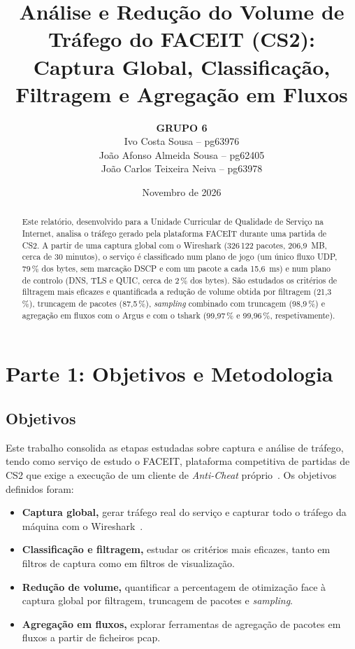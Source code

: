 \documentclass[10.5pt,a4paper]{article}
\title{\textbf{Análise e Redução do Volume de Tráfego do FACEIT (CS2):\\
Captura Global, Classificação, Filtragem e Agregação em Fluxos}}
\author{\textbf{GRUPO 6}\\[2pt]
Ivo Costa Sousa -- pg63976\\
João Afonso Almeida Sousa -- pg62405\\
João Carlos Teixeira Neiva -- pg63978}
\date{Novembro de 2026}
\begin{document}
\maketitle

\begin{abstract}
\noindent Este relatório, desenvolvido para a Unidade Curricular de Qualidade de Serviço na
Internet, analisa o tráfego gerado pela plataforma FACEIT durante uma partida de CS2. A partir
de uma captura global com o Wireshark (326\,122 pacotes, 206,9~MB, cerca de 30 minutos), o
serviço é classificado num plano de jogo (um único fluxo UDP, 79\,\% dos bytes, sem marcação
DSCP e com um pacote a cada 15,6~ms) e num plano de controlo (DNS, TLS e QUIC, cerca de 2\,\%
dos bytes). São estudados os critérios de filtragem mais eficazes e quantificada a redução de
volume obtida por filtragem (21,3\,\%), truncagem de pacotes (87,5\,\%), \emph{sampling}
combinado com truncagem (98,9\,\%) e agregação em fluxos com o Argus e com o tshark
(99,97\,\% e 99,96\,\%, respetivamente).
\end{abstract}

\section{Parte 1: Objetivos e Metodologia}

\subsection{Objetivos}
Este trabalho consolida as etapas estudadas sobre captura e análise de tráfego, tendo como
serviço de estudo o FACEIT, plataforma competitiva de partidas de CS2 que exige a execução de
um cliente de \emph{Anti-Cheat} próprio~\cite{faceitac}. Os objetivos definidos foram:
\begin{itemize}
  \item \textbf{Captura global,} gerar tráfego real do serviço e capturar todo o tráfego da
        máquina com o Wireshark~\cite{wireshark}.
  \item \textbf{Classificação e filtragem,} estudar os critérios mais eficazes, tanto em
        filtros de captura como em filtros de visualização.
  \item \textbf{Redução de volume,} quantificar a percentagem de otimização face à captura
        global por filtragem, truncagem de pacotes e \emph{sampling}.
  \item \textbf{Agregação em fluxos,} explorar ferramentas de agregação de pacotes em fluxos
        a partir de ficheiros pcap.
\end{itemize}
\end{document}
